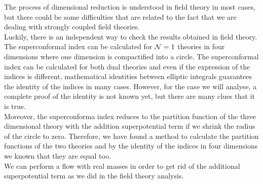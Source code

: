 The process of dimensional reduction is understood in field theory in most cases, but there could be some difficulties that are related to the fact that we are dealing with strongly coupled field theories.\\
Luckily, there is an independent way to check the results obtained in  field theory.\\
The superconformal index can be calculated for $\mathcal{N}=1$ theories in four dimensions where one dimension is compactified into a circle. 
The superconformal index can be calculated for both dual theories and even if the expression of the indices is different, mathematical identities between elliptic integrals guarantees the identity of the indices in many cases.  
However, for the case we will analyse, a complete proof of the identity is not  known yet, but there are many clues that it is true.\\
Moreover, the superconforma index reduces to the partition function of the three dimensional theory with the addition superpotential term if we shrink the radius of the circle to zero.  
Therefore, we have found a method to calculate the partition functions of the two theories and by the identity of the indices in four dimensions we known that they are equal too.\\
We can perform a flow with real masses in order to get rid of the additional superpotential term as we did in the field theory analysis.\\

